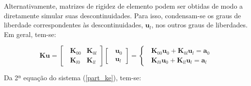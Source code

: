 Alternativamente, matrizes de rigidez de elemento podem ser obtidas de modo a diretamente simular suas descontinuidades. Para isso, condensam-se os graus de liberdade correspondentes às descontinuidades, \(\mathbf{u}_l\), nos outros graus de liberdades. Em geral, tem-se:

\begin{equation} \mathbf{K}\mathbf{u}=\left[\;\; \begin{matrix}
			\mathbf{K}_{00} & \mathbf{K}_{0l} \\
			\mathbf{K}_{l0} & \mathbf{K}_{ll}
		\end{matrix} \right] \left[\;\; \begin{matrix}
			\mathbf{u}_{0} \\ \mathbf{u}_{l}
		\end{matrix} \right] = \left\{ \;\; \begin{matrix}
		\mathbf{K}_{00}\mathbf{u}_{0} + \mathbf{K}_{0l}\mathbf{u}_{l} = \mathbf{a}_0 \\
		\mathbf{K}_{l0}\mathbf{u}_{0} + \mathbf{K}_{ll}\mathbf{u}_{l} = \mathbf{a}_l   \label{part_ke}
	\end{matrix} \right.\end{equation}

\noindent Da 2ª equação do sistema (\ref{part_ke}), tem-se:

